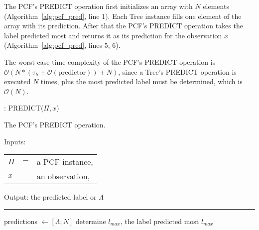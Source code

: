 The PCF's PREDICT operation first initializes an array with
$N$ elements (Algorithm~\ref{alg:pcf_pred}, line 1). Each
Tree instance fills one element of the array with its
prediction. After that the PCF's PREDICT operation takes
the label predicted most and returns it as its prediction
for the observation $x$ (Algorithm~\ref{alg:pcf_pred},
lines 5, 6).

The worst case time complexity of the PCF's PREDICT
operation is $\mathcal{O}(N * (\tau_h + \mathcal{O}
(\text{predictor})) + N)$, since a Tree's PREDICT operation
is executed $N$ times, plus the most predicted label
must be determined, which is $\mathcal{O}(N)$.

\begin{algorithm}
  \caption{: PREDICT($\Pi, x$)}
  \label{alg:pcf_pred}
  The PCF's PREDICT operation.

  Inputs:

    \begin{tabu}{llX}
    $\Pi$ &$-$ &a PCF instance,\\
    $x$ &$-$ &an observation, \\
    \end{tabu}

  Output: the predicted label or $\Lambda$

  \noindent\rule{\linewidth}{0.4pt}

  \begin{algorithmic}[1]
    \STATE predictions $\leftarrow [\Lambda; N]$
    \ENDFOR
    \STATE determine $l_{max}$, the label predicted most
    \RETURN $l_{max}$
  \end{algorithmic}
\end{algorithm}

